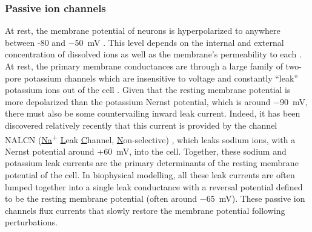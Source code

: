 \subsubsection{Passive ion channels} \label{sec:I_L}
At rest, the membrane potential of neurons is hyperpolarized to anywhere between -80 and \qty{-50}{\milli\volt} \cite{Ren2011}. This level depends on the internal and external concentration of dissolved ions as well as the membrane's permeability to each \cite{Hodgkin1949}. At rest, the primary membrane conductances are through a large family of two-pore potassium channels \cite{Goldstein2005,Ren2011} which are insensitive to voltage and constantly ``leak'' potassium ions out of the cell \cite{Goldstein2001}. Given that the resting membrane potential is more depolarized than the potassium Nernst potential, which is around \qty{-90}{\milli\volt}, there must also be some countervailing inward leak current. Indeed, it has been discovered relatively recently that this current is provided by the channel NALCN (\underline{Na}\textsuperscript{+} \underline{L}eak \underline{C}hannel, \underline{N}on-selective) \cite{Ren2011}, which leaks sodium ions, with a Nernst potential around  +\qty{60}{\milli\volt}, into the cell. Together, these sodium and potassium leak currents are the primary determinants of the resting membrane potential of the cell. In biophysical modelling, all these leak currents are often lumped together into a single leak conductance with a reversal potential defined to be the resting membrane potential (often around \qty{-65}{\milli\volt}). These passive ion channels flux currents that slowly restore the membrane potential following perturbations.

